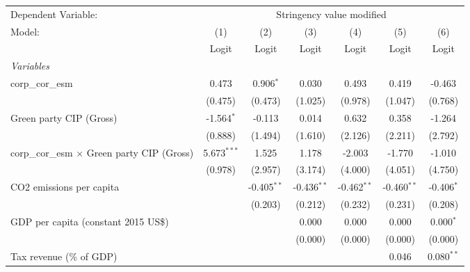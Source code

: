 
\begingroup
\centering
\begin{tabular}{lcccccc}
   \toprule
   Dependent Variable: & \multicolumn{6}{c}{Stringency value modified}\\
   Model:                                             & (1)           & (2)           & (3)           & (4)           & (5)           & (6)\\  
                                                      &  Logit        & Logit         & Logit         & Logit         & Logit         & Logit\\  
   \midrule
   \emph{Variables}\\
   corp\_cor\_esm                                     & 0.473         & 0.906$^{*}$   & 0.030         & 0.493         & 0.419         & -0.463\\   
                                                      & (0.475)       & (0.473)       & (1.025)       & (0.978)       & (1.047)       & (0.768)\\   
   Green party CIP (Gross)                            & -1.564$^{*}$  & -0.113        & 0.014         & 0.632         & 0.358         & -1.264\\   
                                                      & (0.888)       & (1.494)       & (1.610)       & (2.126)       & (2.211)       & (2.792)\\   
   corp\_cor\_esm $\times$ Green party CIP (Gross)    & 5.673$^{***}$ & 1.525         & 1.178         & -2.003        & -1.770        & -1.010\\   
                                                      & (0.978)       & (2.957)       & (3.174)       & (4.000)       & (4.051)       & (4.750)\\   
   CO2 emissions per capita                           &               & -0.405$^{**}$ & -0.436$^{**}$ & -0.462$^{**}$ & -0.460$^{**}$ & -0.406$^{*}$\\   
                                                      &               & (0.203)       & (0.212)       & (0.232)       & (0.231)       & (0.208)\\   
   GDP per capita (constant 2015 US\$)                &               &               & 0.000         & 0.000         & 0.000         & 0.000$^{*}$\\   
                                                      &               &               & (0.000)       & (0.000)       & (0.000)       & (0.000)\\   
   Tax revenue (\% of GDP)                            &               &               &               &               & 0.046         & 0.080$^{**}$\\   

\end{tabular}
